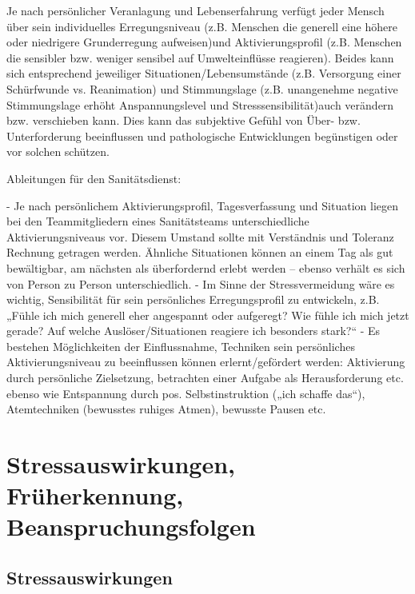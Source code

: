 Je nach persönlicher Veranlagung und Lebenserfahrung verfügt jeder Mensch über sein individuelles Erregungsniveau (z.B. Menschen die generell eine höhere oder niedrigere Grunderregung aufweisen)und Aktivierungsprofil (z.B. Menschen die sensibler bzw. weniger sensibel auf Umwelteinflüsse reagieren). Beides kann sich entsprechend jeweiliger Situationen/Lebensumstände (z.B. Versorgung einer Schürfwunde vs. Reanimation)   und
Stimmungslage (z.B. unangenehme negative Stimmungslage erhöht Anspannungslevel und Stresssensibilität)auch verändern bzw. verschieben kann. Dies kann das subjektive Gefühl von Über- bzw. Unterforderung beeinflussen und pathologische Entwicklungen begünstigen oder vor solchen schützen.



Ableitungen für den Sanitätsdienst: 

- Je nach persönlichem Aktivierungsprofil, Tagesverfassung und Situation liegen bei den Teammitgliedern eines Sanitätsteams unterschiedliche Aktivierungsniveaus vor. Diesem Umstand sollte mit Verständnis und Toleranz Rechnung getragen werden. Ähnliche Situationen können an einem Tag als gut bewältigbar, am nächsten als überfordernd erlebt werden – ebenso verhält es sich von Person zu Person unterschiedlich.
- Im Sinne der Stressvermeidung wäre es wichtig, Sensibilität für sein persönliches Erregungsprofil zu entwickeln, z.B. „Fühle ich mich generell eher angespannt oder aufgeregt? Wie fühle ich mich jetzt gerade? Auf welche Auslöser/Situationen reagiere ich besonders stark?“
- Es bestehen Möglichkeiten der Einflussnahme, Techniken sein persönliches Aktivierungsniveau zu beeinflussen können erlernt/gefördert werden: Aktivierung durch persönliche Zielsetzung, betrachten einer Aufgabe als Herausforderung etc. ebenso wie Entspannung durch pos. Selbstinstruktion („ich schaffe das“), Atemtechniken (bewusstes ruhiges Atmen), bewusste Pausen etc.



\section{Stressauswirkungen, Früherkennung, Beanspruchungsfolgen}



\subsection{Stressauswirkungen}
\label{topic:stressauswirkungen-psi}

